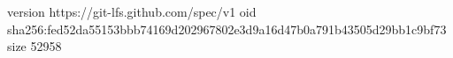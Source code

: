 version https://git-lfs.github.com/spec/v1
oid sha256:fed52da55153bbb74169d202967802e3d9a16d47b0a791b43505d29bb1c9bf73
size 52958
